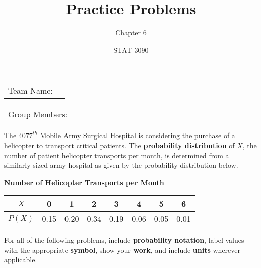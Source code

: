 \documentclass[noanswers]{exam}
\title{Practice Problems}
\author{Chapter 6}
\date{STAT 3090}
\begin{document}
\noindent\begin{tabular}{@{}p{1.05in}p{3.2in}@{}}
Team Name: & \hrulefill
\end{tabular}

\vspace{.5mm}

\noindent\begin{tabular}{@{}p{1.05in}p{3.2in}@{}}
Group Members: & \hrulefill
\end{tabular}

\vspace{3mm}

\noindent The $4077^{th}$ Mobile Army Surgical Hospital is considering the purchase of a helicopter to transport critical patients. The \textbf{probability distribution} of $X$, the number of patient helicopter transports per month, is determined from a similarly-sized army hospital as given by the probability distribution below.

\begin{center}
    \textbf{Number of Helicopter Transports per Month}
    
    \vspace{1mm}
    
    \begin{tabular}{| c | c | c | c | c | c | c | c |}
        \hline
        $X$ & 0 & 1 & 2 & 3 & 4 & 5 & 6 \\
         \hline
        $P(X)$ & 0.15 & 0.20 & 0.34 & 0.19 & 0.06 & 0.05 & 0.01 \\
         \hline
    \end{tabular}
	\end{center}
\vspace{3mm}

\noindent For all of the following problems, include \textbf{probability notation}, label values with the appropriate \textbf{symbol}, show your \textbf{work}, and include \textbf{units} wherever applicable.

\vspace{3mm}
\end{document}

